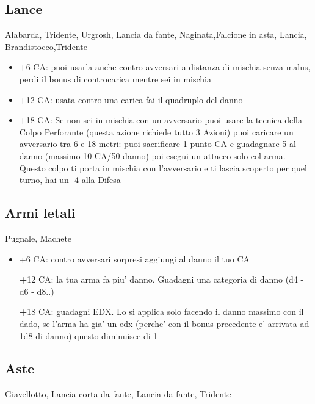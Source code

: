\documentclass[a4paper,11pt,twoside,openany]{book}
\begin{document}
\subsection{Lance} Alabarda, Tridente, Urgrosh, Lancia da fante, Naginata,Falcione in asta, Lancia, Brandistocco,Tridente

\begin{itemize}
\item +6 CA: puoi usarla anche contro avversari a distanza di mischia senza malus, perdi il bonus di controcarica mentre sei in mischia

\item +12 CA: usata contro una carica fai il quadruplo del danno

\item +18 CA: Se non sei in mischia con un avversario puoi usare la tecnica della Colpo Perforante (questa azione richiede tutto 3 Azioni) puoi caricare un avversario tra 6 e 18 metri: puoi sacrificare 1 punto CA e guadagnare 5 al danno (massimo 10 CA/50 danno) poi esegui un attacco solo col arma. Questo colpo ti porta in mischia con l'avversario e ti lascia scoperto per quel turno, hai un -4 alla Difesa

\end{itemize}

\subsection{Armi letali} Pugnale, Machete

\begin{itemize}

\item +6 CA: contro avversari sorpresi aggiungi al danno il tuo CA

\textbf +12 CA: la tua arma fa piu' danno. Guadagni una categoria di danno (d4 - d6 - d8..)

\textbf +18 CA: guadagni EDX. Lo si applica solo facendo il danno massimo con il dado, se l'arma ha gia' un edx (perche' con il bonus precedente e' arrivata ad 1d8 di danno)
questo diminuisce di 1

\end{itemize}

\subsection{Aste} Giavellotto, Lancia corta da fante, Lancia da fante, Tridente
\end{document}
